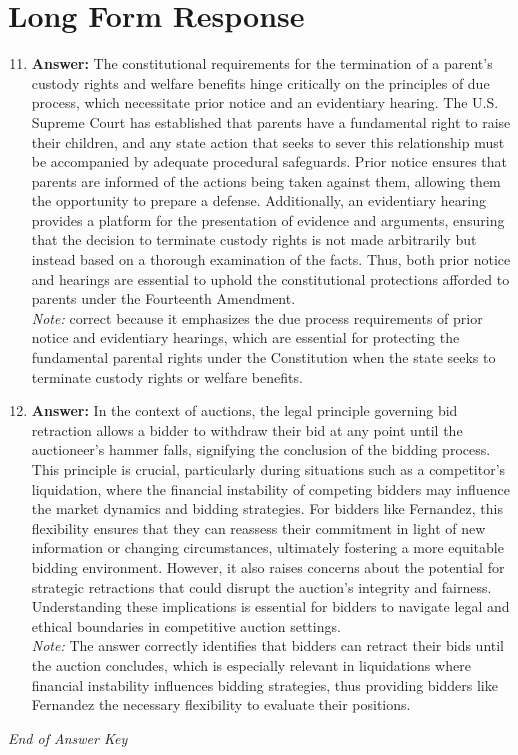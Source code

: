 \documentclass[12pt]{article}
\begin{document}
\section*{Long Form Response}
\begin{enumerate}[label=\arabic*.]
\setcounter{enumi}{10}
\item \textbf{Answer:} The constitutional requirements for the termination of a parent's custody rights and welfare benefits hinge critically on the principles of due process, which necessitate prior notice and an evidentiary hearing. The U.S. Supreme Court has established that parents have a fundamental right to raise their children, and any state action that seeks to sever this relationship must be accompanied by adequate procedural safeguards. Prior notice ensures that parents are informed of the actions being taken against them, allowing them the opportunity to prepare a defense. Additionally, an evidentiary hearing provides a platform for the presentation of evidence and arguments, ensuring that the decision to terminate custody rights is not made arbitrarily but instead based on a thorough examination of the facts. Thus, both prior notice and hearings are essential to uphold the constitutional protections afforded to parents under the Fourteenth Amendment.
\\ \textit{Note:} correct because it emphasizes the due process requirements of prior notice and evidentiary hearings, which are essential for protecting the fundamental parental rights under the Constitution when the state seeks to terminate custody rights or welfare benefits.
\item \textbf{Answer:} In the context of auctions, the legal principle governing bid retraction allows a bidder to withdraw their bid at any point until the auctioneer's hammer falls, signifying the conclusion of the bidding process. This principle is crucial, particularly during situations such as a competitor's liquidation, where the financial instability of competing bidders may influence the market dynamics and bidding strategies. For bidders like Fernandez, this flexibility ensures that they can reassess their commitment in light of new information or changing circumstances, ultimately fostering a more equitable bidding environment. However, it also raises concerns about the potential for strategic retractions that could disrupt the auction's integrity and fairness. Understanding these implications is essential for bidders to navigate legal and ethical boundaries in competitive auction settings.
\\ \textit{Note:} The answer correctly identifies that bidders can retract their bids until the auction concludes, which is especially relevant in liquidations where financial instability influences bidding strategies, thus providing bidders like Fernandez the necessary flexibility to evaluate their positions.
\end{enumerate}

\vfill
\noindent\textit{End of Answer Key}
\end{document}
